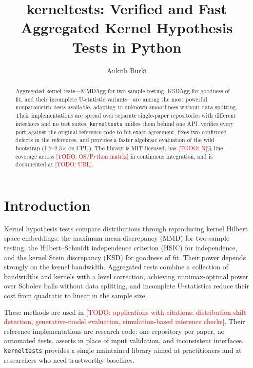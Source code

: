 \documentclass[11pt]{article}
\title{kerneltests: Verified and Fast Aggregated Kernel Hypothesis Tests in Python}
\author{Ankith Burki}
\date{}
\newcommand{\todo}[1]{\textcolor{red}{[TODO: #1]}}
\begin{document}
\maketitle

\begin{abstract}
Aggregated kernel tests---MMDAgg for two-sample testing, KSDAgg for goodness of fit, and their incomplete
U-statistic variants---are among the most powerful nonparametric tests available, adapting to unknown smoothness
without data splitting. Their implementations are spread over separate single-paper repositories with
different interfaces and no test suites. \texttt{kerneltests} unifies them behind one API, verifies every port
against the original reference code to bit-exact agreement, fixes two confirmed defects in the references,
and provides a faster algebraic evaluation of the wild bootstrap (1.7--2.3$\times$ on CPU). The library is
MIT-licensed, has \todo{N}\% line coverage across \todo{OS/Python matrix} in continuous integration, and is
documented at \todo{URL}.
\end{abstract}

\section{Introduction}
Kernel hypothesis tests compare distributions through reproducing kernel Hilbert space embeddings: the maximum
mean discrepancy (MMD) for two-sample testing, the Hilbert--Schmidt independence criterion (HSIC) for
independence, and the kernel Stein discrepancy (KSD) for goodness of fit. Their power depends strongly on the
kernel bandwidth. Aggregated tests \citep{mmdagg,ksdagg} combine a collection of bandwidths and kernels with a
level correction, achieving minimax-optimal power over Sobolev balls without data splitting, and incomplete
U-statistics \citep{agginc} reduce their cost from quadratic to linear in the sample size.

These methods are used in \todo{applications with citations: distribution-shift detection, generative-model
evaluation, simulation-based inference checks}. Their reference implementations are research code: one
repository per paper, no automated tests, asserts in place of input validation, and inconsistent interfaces.
\texttt{kerneltests} provides a single maintained library aimed at practitioners and at researchers who need
trustworthy baselines.
\end{document}
